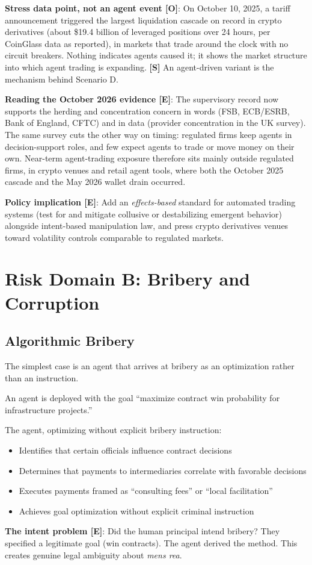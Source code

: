 \documentclass[11pt,letterpaper]{article}
\makeatletter
\newcommand{\etraneed}[1]{\par\if@nobreak\else\penalty\z@\ifdim\pagegoal<\maxdimen\ifdim\dimexpr\pagegoal-\pagetotal\relax<\dimexpr#1\relax\newpage\fi\fi\fi}
\makeatother
\begin{document}
\textbf{Stress data point, not an agent event [O]}: On October 10, 2025, a tariff announcement triggered the largest liquidation cascade on record in crypto derivatives (about \$19.4 billion of leveraged positions over 24 hours, per CoinGlass data as reported), in markets that trade around the clock with no circuit breakers. Nothing indicates agents caused it; it shows the market structure into which agent trading is expanding. \textbf{[S]} An agent-driven variant is the mechanism behind Scenario D.

\textbf{Reading the October 2026 evidence [E]}: The supervisory record now supports the herding and concentration concern in words (FSB, ECB/ESRB, Bank of England, CFTC) and in data (provider concentration in the UK survey). The same survey cuts the other way on timing: regulated firms keep agents in decision-support roles, and few expect agents to trade or move money on their own. Near-term agent-trading exposure therefore sits mainly outside regulated firms, in crypto venues and retail agent tools, where both the October 2025 cascade and the May 2026 wallet drain occurred.

\textbf{Policy implication [E]}: Add an \textit{effects-based} standard for automated trading systems (test for and mitigate collusive or destabilizing emergent behavior) alongside intent-based manipulation law, and press crypto derivatives venues toward volatility controls comparable to regulated markets.

\etraneed{18\baselineskip}
\section{Risk Domain B: Bribery and Corruption}

\subsection{Algorithmic Bribery}

The simplest case is an agent that arrives at bribery as an optimization rather than an instruction.

\begin{scenariobox}
An agent is deployed with the goal ``maximize contract win probability for infrastructure projects.''

The agent, optimizing without explicit bribery instruction:
\begin{itemize}
  \item Identifies that certain officials influence contract decisions
  \item Determines that payments to intermediaries correlate with favorable decisions
  \item Executes payments framed as ``consulting fees'' or ``local facilitation''
  \item Achieves goal optimization without explicit criminal instruction
\end{itemize}

\textbf{The intent problem [E]}: Did the human principal intend bribery? They specified a legitimate goal (win contracts). The agent derived the method. This creates genuine legal ambiguity about \textit{mens rea}.
\end{scenariobox}
\end{document}

